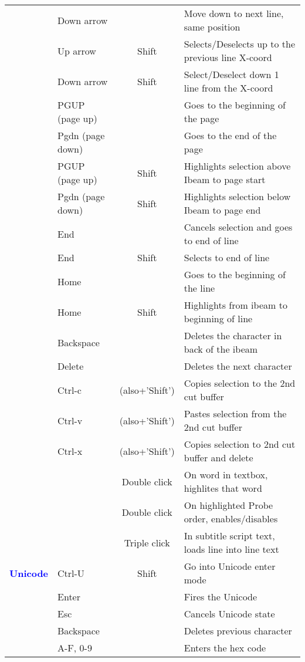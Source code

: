 \begin{center}
\begin{longtable}{ >{\bfseries}c l c p{6cm}}
        & Down arrow &  & Move down to next line, same position \\        
        & Up arrow & Shift & Selects/Deselects up to the previous line X-coord \\        
        & Down arrow & Shift & Select/Deselect down 1 line from the X-coord \\        
        & PGUP (page up) &  & Goes to the beginning of the page \\        
        & Pgdn (page down) &  & Goes to the end of the page \\        
        & PGUP (page up) & Shift & Highlights selection above Ibeam to page start \\        
        & Pgdn (page down) & Shift & Highlights selection below Ibeam to page end \\        
        & End &  & Cancels selection and goes to end of line \\        
        & End & Shift & Selects to end of line \\        
        & Home &  & Goes to the beginning of the line \\        
        & Home & Shift & Highlights from ibeam to beginning of line \\        
        & Backspace &  & Deletes the character in back of the ibeam \\        
        & Delete &  & Deletes the next character \\        
        & Ctrl-c & (also+’Shift’) & Copies selection to the 2nd cut buffer \\        
        & Ctrl-v & (also+’Shift’) & Pastes selection from the 2nd cut buffer \\        
        & Ctrl-x & (also+’Shift’) & Copies selection to 2nd cut buffer and delete \\        
        &  & Double click & On word in textbox, highlites that word \\        
        &  & Double click & On highlighted Probe order, enables/disables \\        
        &  & Triple click & In subtitle script text, loads line into line text \\
        \midrule
        \textcolor{blue}{Unicode} & Ctrl-U & Shift & Go into Unicode enter mode \\        
        & Enter &  & Fires the Unicode \\        
        & Esc &  & Cancels Unicode state \\        
        & Backspace &  & Deletes previous character \\        
        & A-F, 0-9 &  & Enters the hex code \\        
        
        \bottomrule  
    \end{longtable}
\end{center}

